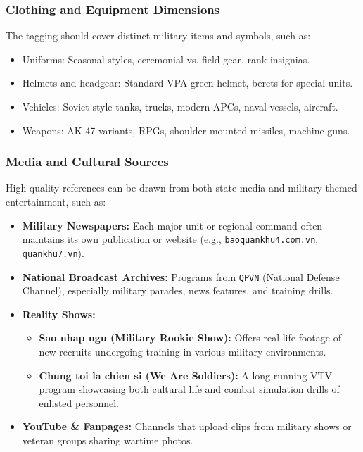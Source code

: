 \documentclass[conference]{IEEEtran}
\begin{document}
\subsubsection{Clothing and Equipment Dimensions}

The tagging should cover distinct military items and symbols, such as:

\begin{itemize}
	\item Uniforms: Seasonal styles, ceremonial vs. field gear, rank insignias.
	\item Helmets and headgear: Standard VPA green helmet, berets for special units.
	\item Vehicles: Soviet-style tanks, trucks, modern APCs, naval vessels, aircraft.
	\item Weapons: AK-47 variants, RPGs, shoulder-mounted missiles, machine guns.
\end{itemize}

\subsubsection{Media and Cultural Sources}

High-quality references can be drawn from both state media and military-themed entertainment, such as:

\begin{itemize}
	\item \textbf{Military Newspapers:} Each major unit or regional command often maintains its own publication or website (e.g., \texttt{baoquankhu4.com.vn}, \texttt{quankhu7.vn}).
	\item \textbf{National Broadcast Archives:} Programs from \texttt{QPVN} (National Defense Channel), especially military parades, news features, and training drills.
	\item \textbf{Reality Shows:}
	\begin{itemize}
		\item \textbf{Sao nhap ngu (Military Rookie Show):} Offers real-life footage of new recruits undergoing training in various military environments.
		\item \textbf{Chung toi la chien si (We Are Soldiers):} A long-running VTV program showcasing both cultural life and combat simulation drills of enlisted personnel.
	\end{itemize}
	\item \textbf{YouTube \& Fanpages:} Channels that upload clips from military shows or veteran groups sharing wartime photos.
\end{itemize}
\end{document}
